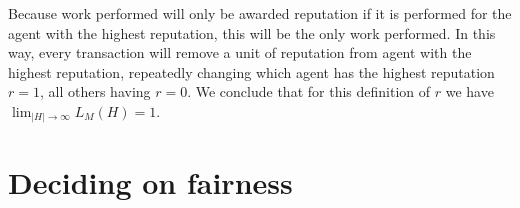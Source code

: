 Because work performed will only be awarded reputation if it is performed for the agent with the highest reputation, this will be the only work performed. In this way, every transaction will remove a unit of reputation from agent with the highest reputation, repeatedly changing which agent has the highest reputation $r = 1$, all others having $r = 0$. We conclude that for this definition of $r$ we have $\lim_{|H| \to \infty} L_M(H) = 1$.

\section{Deciding on fairness}
